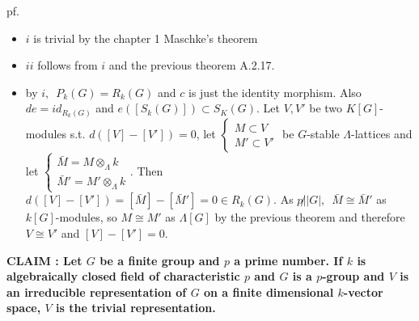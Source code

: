 \documentclass[12pt,letterpaper]{report}
\begin{document}
pf.\begin{itemize}\item $i$ is trivial by the chapter 1 Maschke's theorem 
\item $ii$ follows from $i$ and the previous theorem A.2.17.
\item by $i,\,\,\,P_{k}(G)=R_{k}(G)$ and $c$ is just the identity morphism. Also $de=id_{R_{k}(G)}$ and $e([S_{k}(G)])\subset S_{K}(G)$. Let $V,V'$ be two $K[G]$-modules s.t. $d([V]-[V'])=0$, let $\left\{\begin{array}{r}M\subset V\\M'\subset V'\end{array}\right.$ be $G$-stable $\Lambda$-lattices and let $\left\{\begin{array}{r}\bar{M}=M\otimes_{\Lambda}k\\\bar{M}'=M'\otimes_{\Lambda}k\end{array}\right.$. Then $d([V]-[V'])=[\bar{M}]-[\bar{M}']=0\in R_{k}(G)$. As $p\not||G|,\,\,\,\bar{M}\cong\bar{M}'$ as $k[G]$-modules, so $M\cong M'$ as $\Lambda[G]$ by the previous theorem and therefore $V\cong V'$ and $[V]-[V']=0$.

\end{itemize}
\textbf{CLAIM : Let $G$ be a finite group and $p$ a prime number. If $k$ is algebraically closed field of characteristic $p$ and $G$ is a $p$-group and $V$ is an irreducible representation of $G$ on a finite dimensional $k$-vector space, $V$ is the trivial representation.}
\end{document}
